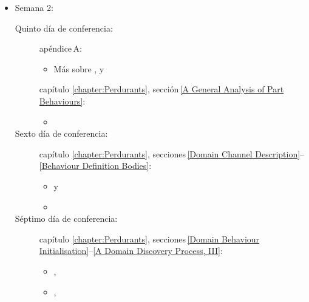 {\begin{itemize}
\begin{description}
\item[Cuarto día de conferencia:] secciones\,\,\ref{chap4.Attributes}--\ref{A
    Domain Discovery Process, II}:
\begin{itemize}
\item {},
\item {},
\item {}
\end{itemize}
\end{description}
\item Semana 2:
\begin{description}
\item[Quinto día de conferencia:]  apéndice\,A: 
\begin{itemize}
\item {}  Más sobre , y
\end{itemize}
 capítulo\,\,\ref{chapter:Perdurants}, sección\,\ref{A General Analysis of Part  Behaviours}:
\begin{itemize}
\item {}
\end{itemize}
\item[Sexto día de conferencia:] capítulo\,\,\ref{chapter:Perdurants},
  secciones\,\ref{Domain Channel Description}--\ref{Behaviour Definition Bodies}: 
\begin{itemize}
\item {} y
\item {} %
\end{itemize}
\item[Séptimo día de conferencia:] capítulo\,\,\ref{chapter:Perdurants},
  secciones\,\ref{Domain Behaviour Initialisation}--\ref{A Domain Discovery Process, III}:
\begin{itemize}
\item {}, 
\item {}, %
\end{itemize}
\end{description}
\end{itemize}
\afslut
}%

